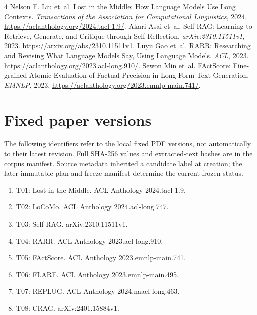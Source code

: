 \documentclass{article}
\begin{document}
\begin{thebibliography}{4}
Nelson F. Liu et~al. Lost in the Middle: How Language Models Use Long Contexts.
\emph{Transactions of the Association for Computational Linguistics}, 2024.
\url{https://aclanthology.org/2024.tacl-1.9/}.
Akari Asai et~al. Self-RAG: Learning to Retrieve, Generate, and Critique through Self-Reflection.
\emph{arXiv:2310.11511v1}, 2023.
\url{https://arxiv.org/abs/2310.11511v1}.
Luyu Gao et~al. RARR: Researching and Revising What Language Models Say, Using Language Models.
\emph{ACL}, 2023.
\url{https://aclanthology.org/2023.acl-long.910/}.
Sewon Min et~al. FActScore: Fine-grained Atomic Evaluation of Factual Precision in Long Form Text Generation.
\emph{EMNLP}, 2023.
\url{https://aclanthology.org/2023.emnlp-main.741/}.
\end{thebibliography}

\appendix
\section{Fixed paper versions}\label{app:sources}
The following identifiers refer to the local fixed PDF versions, not automatically to their latest revision. Full SHA-256 values and extracted-text hashes are in the corpus manifest. Source metadata inherited a candidate label at creation; the later immutable plan and freeze manifest determine the current frozen status.
\begin{enumerate}
\item T01: Lost in the Middle. ACL Anthology 2024.tacl-1.9.
\item T02: LoCoMo. ACL Anthology 2024.acl-long.747.
\item T03: Self-RAG. arXiv:2310.11511v1.
\item T04: RARR. ACL Anthology 2023.acl-long.910.
\item T05: FActScore. ACL Anthology 2023.emnlp-main.741.
\item T06: FLARE. ACL Anthology 2023.emnlp-main.495.
\item T07: REPLUG. ACL Anthology 2024.naacl-long.463.
\item T08: CRAG. arXiv:2401.15884v1.
\end{enumerate}
\end{document}
